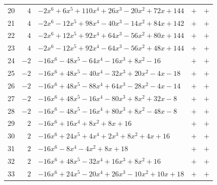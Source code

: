 \documentclass[11pt]{article}
\begin{document}
\begin{longtable}{@{}rrlcc@{}}
20 & $4$ & $-2x^{6}+6x^{5}+110x^{4}+26x^{3}-20x^{2}+72x+144$ & $+$ & $+$\\
21 & $4$ & $-2x^{6}-12x^{5}+98x^{4}-40x^{3}-14x^{2}+84x+142$ & $+$ & $+$\\
22 & $4$ & $-2x^{6}+12x^{5}+92x^{4}+64x^{3}-56x^{2}+80x+144$ & $+$ & $+$\\
23 & $4$ & $-2x^{6}-12x^{5}+92x^{4}-64x^{3}-56x^{2}+48x+144$ & $+$ & $+$\\
24 & $-2$ & $-16x^{6}-48x^{5}-64x^{4}-16x^{3}+8x^{2}-16$ & $+$ & $+$\\
25 & $-2$ & $-16x^{6}+48x^{5}-40x^{4}-32x^{3}+20x^{2}-4x-18$ & $+$ & $+$\\
26 & $-2$ & $-16x^{6}+48x^{5}-88x^{4}+64x^{3}-28x^{2}-4x-14$ & $+$ & $+$\\
27 & $-2$ & $-16x^{6}+48x^{5}-16x^{4}-80x^{3}+8x^{2}+32x-8$ & $+$ & $+$\\
28 & $-2$ & $-16x^{6}-48x^{5}-16x^{4}+80x^{3}+8x^{2}-48x-8$ & $+$ & $+$\\
29 & $2$ & $-16x^{6}+16x^{4}+8x^{2}+8x+16$ & $+$ & $+$\\
30 & $2$ & $-16x^{6}+24x^{5}+4x^{4}+2x^{3}+8x^{2}+4x+16$ & $+$ & $+$\\
31 & $2$ & $-16x^{6}-8x^{4}-4x^{2}+8x+18$ & $+$ & $+$\\
32 & $2$ & $-16x^{6}+48x^{5}-32x^{4}+16x^{3}+8x^{2}+16$ & $+$ & $+$\\
33 & $2$ & $-16x^{6}+24x^{5}-20x^{4}+26x^{3}-10x^{2}+10x+18$ & $+$ & $+$\\
\end{longtable}
\endgroup
\end{document}
